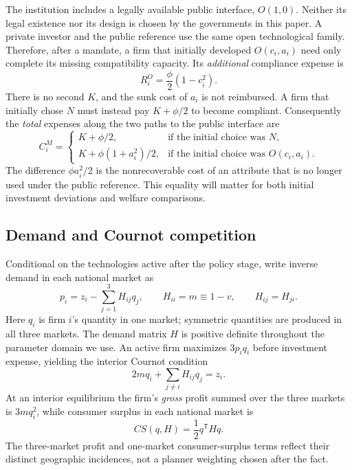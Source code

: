 The institution includes a legally available public interface, \(O(1,0)\). Neither its legal existence nor its design is chosen by the governments in this paper. A private investor and the public reference use the same open technological family. Therefore, after a mandate, a firm that initially developed \(O(c_i,a_i)\) need only complete its missing compatibility capacity. Its \emph{additional} compliance expense is
\begin{equation}
 R_i^{O}=\frac{\phi}{2}(1-c_i^2).
 \label{eq:retrofit}
\end{equation}
There is no second \(K\), and the sunk cost of \(a_i\) is not reimbursed. A firm that initially chose \(N\) must instead pay \(K+\phi/2\) to become compliant. Consequently the \emph{total} expenses along the two paths to the public interface are
\begin{equation}
 C_i^M =
 \begin{cases}
  K+\phi/2, &\text{if the initial choice was }N,\\
  K+\phi(1+a_i^2)/2, &\text{if the initial choice was }O(c_i,a_i).
 \end{cases}
 \label{eq:final-cost}
\end{equation}
The difference \(\phi a_i^2/2\) is the nonrecoverable cost of an attribute that is no longer used under the public reference. This equality will matter for both initial investment deviations and welfare comparisons.

\subsection{Demand and Cournot competition}\label{subsec:demand}

Conditional on the technologies active after the policy stage, write inverse demand in each national market as
\begin{equation}
 p_i=z_i-\sum_{j=1}^3 H_{ij}q_j,\qquad
 H_{ii}=m\equiv1-v,\qquad H_{ij}=H_{ji}.
 \label{eq:inverse-demand}
\end{equation}
Here \(q_i\) is firm \(i\)'s quantity in one market; symmetric quantities are produced in all three markets. The demand matrix \(H\) is positive definite throughout the parameter domain we use. An active firm maximizes \(3p_iq_i\) before investment expense, yielding the interior Cournot condition
\begin{equation}
 2m q_i+\sum_{j\ne i}H_{ij}q_j=z_i.
 \label{eq:cournot-foc}
\end{equation}
At an interior equilibrium the firm's \emph{gross} profit summed over the three markets is \(3m q_i^2\), while consumer surplus in each national market is
\begin{equation}
 CS(q,H)=\frac{1}{2}q^{\mathsf T}Hq.
 \label{eq:cs}
\end{equation}
The three-market profit and one-market consumer-surplus terms reflect their distinct geographic incidences, not a planner weighting chosen after the fact.

